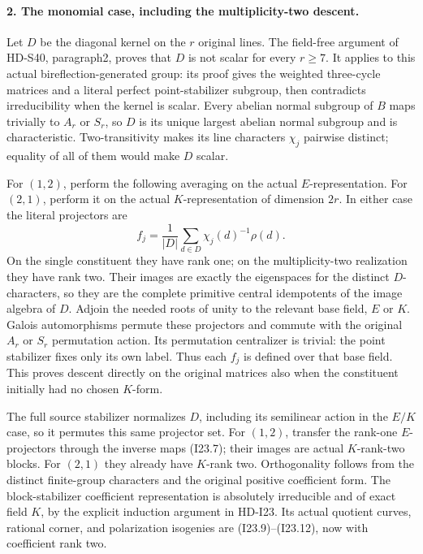 \paragraph{2. The monomial case, including the multiplicity-two descent.}
Let \(D\) be the diagonal kernel on the \(r\) original lines.
The field-free argument of HD-S40, paragraph2, proves that
\(D\) is not scalar for every \(r\ge7\). It applies to
this actual bireflection-generated group: its proof gives the
weighted three-cycle matrices and a literal perfect
point-stabilizer subgroup, then contradicts irreducibility
when the kernel is scalar. Every abelian normal subgroup of
\(B\) maps trivially to \(A_r\) or \(S_r\), so \(D\)
is its unique largest abelian normal subgroup and is
characteristic. Two-transitivity makes its line characters
\(\chi_j\) pairwise distinct; equality of all of them would
make \(D\) scalar.

For \((1,2)\), perform the following averaging on the actual
\(E\)-representation. For \((2,1)\), perform it on the
actual \(K\)-representation of dimension \(2r\). In either
case the literal projectors are
\[
                   f_j=\frac1{|D|}\sum_{d\in D}
                                  \chi_j(d)^{-1}\rho(d).
                                                               \tag{I25.1}
\]
On the single constituent they have rank one; on the
multiplicity-two realization they have rank two. Their images
are exactly the eigenspaces for the distinct \(D\)-characters,
so they are the complete primitive central idempotents of the
image algebra of \(D\). Adjoin the needed roots of unity to
the relevant base field, \(E\) or \(K\). Galois automorphisms
permute these projectors and commute with the original
\(A_r\) or \(S_r\) permutation action. Its permutation
centralizer is trivial: the point stabilizer fixes only its
own label. Thus each \(f_j\) is defined over that base field.
This proves descent directly on the original matrices also
when the constituent initially had no chosen \(K\)-form.

The full source stabilizer normalizes \(D\), including its
semilinear action in the \(E/K\) case, so it permutes this
same projector set. For \((1,2)\), transfer the rank-one
\(E\)-projectors through the inverse maps (I23.7); their
images are actual \(K\)-rank-two blocks. For \((2,1)\)
they already have \(K\)-rank two. Orthogonality follows
from the distinct finite-group characters and the original
positive coefficient form. The block-stabilizer coefficient
representation is absolutely irreducible and of exact field
\(K\), by the explicit induction argument in HD-I23.
Its actual quotient curves, rational corner, and polarization
isogenies are (I23.9)--(I23.12), now with coefficient rank two.

